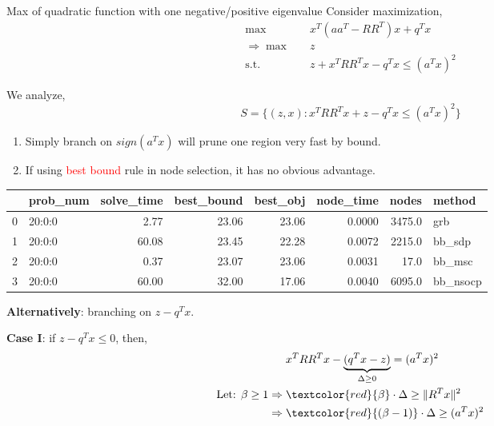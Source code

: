 \documentclass[aspectratio=1610, 10pt]{beamer}
\newcommand{\st}{\mathrm{s.t.\;}}
\newcommand{\red}[1]{\textcolor{red}{#1}}
\begin{document}
\begin{frame}[allowframebreaks]{Max of quadratic function with one negative/positive eigenvalue}
  Consider maximization,
  \begin{align*}
    \max \quad             & x^T(aa^T-RR^T)x + q^Tx           \\
    \Rightarrow \max \quad & z                                \\
    \st \quad              & z + x^TRR^Tx - q^Tx \le (a^Tx)^2
  \end{align*}

  We analyze,
  \begin{equation*}
    S = \{(z, x): x^TRR^Tx + z - q^Tx \le (a^Tx)^2\}
  \end{equation*}

  \begin{enumerate}
    \item Simply branch on \(sign(a^Tx)\) will prune one region very fast by bound.
    \item If using \red{best bound} rule in node selection, it has no obvious advantage.
  \end{enumerate}

  \begin{tabular}{llrrrrrl}
    \toprule
    {} & prob\_num & solve\_time & best\_bound & best\_obj & node\_time & nodes  & method    \\
    \midrule
    0  & 20:0:0    & 2.77        & 23.06       & 23.06     & 0.0000     & 3475.0 & grb       \\
    1  & 20:0:0    & 60.08       & 23.45       & 22.28     & 0.0072     & 2215.0 & bb\_sdp   \\
    2  & 20:0:0    & 0.37        & 23.07       & 23.06     & 0.0031     & 17.0   & bb\_msc   \\
    3  & 20:0:0    & 60.00       & 32.00       & 17.06     & 0.0040     & 6095.0 & bb\_nsocp \\
    \bottomrule
  \end{tabular}
  \framebreak

  \textbf{Alternatively}: branching on \(z - q^Tx\).

  \textbf{Case I}: if \(z - q^Tx \le 0\), then,
  \begin{align*}
                                           & x^TRR^Tx - \underbrace{(q^Tx - z)}_{\Delta \ge 0} = (a^Tx)^2 \\
    \text{Let: }\beta \ge 1 \Rightarrow \; & \red{\beta}\cdot \Delta\ge \|R^Tx\|^2                        \\
    \Rightarrow \;                         & \red{(\beta - 1)}\cdot\Delta \ge (a^Tx)^2
  \end{align*}


\end{frame}
\end{document}
